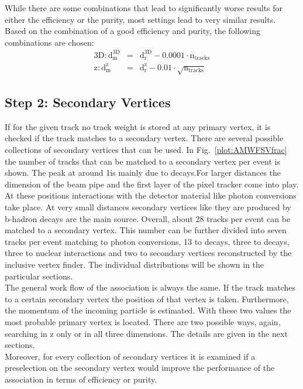 While there are some combinations that lead to significantly worse results for either the efficiency or the purity, most settings lead to very similar results. Based on the combination of a good efficiency and purity, the following combinations are chosen:
\begin{eqnarray}
    \textrm{3D}: \textrm{d}_{\textrm{m}}^{\textrm{3D}} & = & \textrm{d}_{\textrm{r}}^{\textrm{3D}}- 0.0001 \cdot \textrm{n}_{\textrm{tracks}} \label{eqn:AMWFCVweight3} \\
    \textrm{z}:\textrm{d}_{\textrm{m}}^{\textrm{z}} & = & \textrm{d}_{\textrm{r}}^{\textrm{z}}- 0.01 \cdot \sqrt{\textrm{n}_{\textrm{tracks}}} \label{eqn:AMWFCVweightz}
\end{eqnarray}

\subsection{Step 2: Secondary Vertices\label{sec:AMWFSV}}

If for the given track no track weight is stored at any primary vertex, it is checked if the track matches to a secondary vertex. There are several possible collections of secondary vertices that can be used. In Fig.~\ref{plot:AMWFSVfrac} the number of tracks that can be matched to a secondary vertex per event is shown. The peak at around 1\cm is mainly due to \PKzS{} decays.For larger distances the dimension of the beam pipe and the first layer of the pixel tracker come into play.  At these positions interactions with the detector material like photon conversions take place. At very small distances secondary vertices like they are produced by b-hadron decays are the main source. Overall, about 28 tracks per event can be matched to a secondary vertex. This number can be further divided into seven tracks per event matching to photon conversions, 13 to \PKzS{} decays, three to \PgL{} decays, three to nuclear interactions and two to secondary vertices reconstructed by the inclusive vertex finder. The individual distributions will be shown in the particular sections.  \\
The general work flow of the association is always the same. If the track matches to a certain secondary vertex the position of that vertex is taken. Furthermore, the momentum of the incoming particle is estimated. With these two values the most probable primary vertex is located. There are two possible ways, again, searching in z only or in all three dimensions. The details are given in the next sections. \\
Moreover, for every collection of secondary vertices it is examined if a preselection on the secondary vertex would improve the performance of the association in terms of efficiency or purity.

